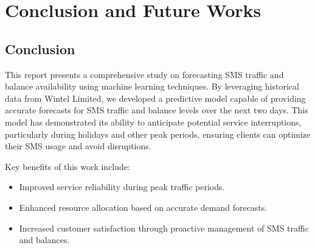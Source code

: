 \documentclass[12pt]{book} %
\begin{document}





\chapter{Conclusion and Future Works}










\section{Conclusion}

This report presents a comprehensive study on forecasting SMS traffic and balance availability using machine learning techniques. By leveraging historical data from Wintel Limited, we developed a predictive model capable of providing accurate forecasts for SMS traffic and balance levels over the next two days. This model has demonstrated its ability to anticipate potential service interruptions, particularly during holidays and other peak periods, ensuring clients can optimize their SMS usage and avoid disruptions.

Key benefits of this work include:

\begin{itemize}
    \item Improved service reliability during peak traffic periods.
    \item Enhanced resource allocation based on accurate demand forecasts.
    \item Increased customer satisfaction through proactive management of SMS traffic and balances.
\end{itemize}
\end{document}
